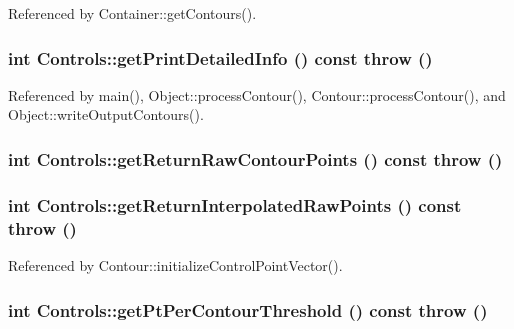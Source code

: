 Referenced by Container::getContours().\hypertarget{classControls_fb69cf3fe723123d382dbf709ece5f84}{
\subsubsection[getPrintDetailedInfo]{\setlength{\rightskip}{0pt plus 5cm}int Controls::getPrintDetailedInfo () const  throw ()}}
\label{classControls_fb69cf3fe723123d382dbf709ece5f84}




Referenced by main(), Object::processContour(), Contour::processContour(), and Object::writeOutputContours().\hypertarget{classControls_7d717253ec34914ab2643b463777f72d}{
\subsubsection[getReturnRawContourPoints]{\setlength{\rightskip}{0pt plus 5cm}int Controls::getReturnRawContourPoints () const  throw ()}}
\label{classControls_7d717253ec34914ab2643b463777f72d}


\hypertarget{classControls_96dac19dcb0a887e9e3f49c663bb5709}{
\subsubsection[getReturnInterpolatedRawPoints]{\setlength{\rightskip}{0pt plus 5cm}int Controls::getReturnInterpolatedRawPoints () const  throw ()}}
\label{classControls_96dac19dcb0a887e9e3f49c663bb5709}




Referenced by Contour::initializeControlPointVector().\hypertarget{classControls_4ba998e75d7c20623b65863de139aecf}{
\subsubsection[getPtPerContourThreshold]{\setlength{\rightskip}{0pt plus 5cm}int Controls::getPtPerContourThreshold () const  throw ()}}
\label{classControls_4ba998e75d7c20623b65863de139aecf}





